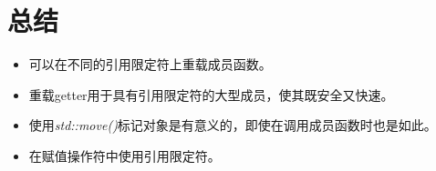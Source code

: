 \section{总结}
\begin{itemize}
	\item 可以在不同的引用限定符上重载成员函数。
	\item 重载getter用于具有引用限定符的大型成员，使其既安全又快速。
	\item 使用\textit{std::move()}标记对象是有意义的，即使在调用成员函数时也是如此。
	\item 在赋值操作符中使用引用限定符。
\end{itemize}


